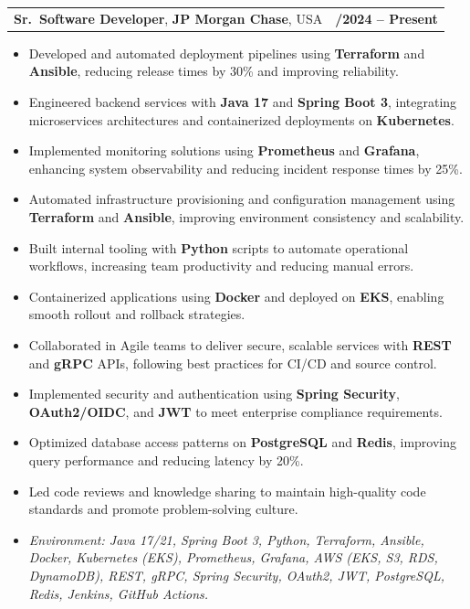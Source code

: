 \documentclass[letterpaper,11pt]{article}
\makeatletter
\newcommand{\resumeItem}[1]{
  \item\footnotesize{
    {#1 \vspace{-2pt}}
  }
}
\newcommand{\resumeSubheading}[4]{
  \vspace{-2pt}\item
    \begin{tabular*}{1.0\textwidth}[t]{l@{\extracolsep{\fill}}r}
      \textbf{\fontsize{10pt}{14pt}\selectfont #3}, \textbf{\fontsize{10pt}{14pt}\selectfont #1}, \fontsize{10pt}{14pt}\selectfont #4 & \textbf{\fontsize{10pt}{14pt}\selectfont #2} \\
    \end{tabular*}\vspace{-7pt}
}
\newcommand{\resumeItemListStart}{\begin{itemize}[leftmargin=*]}
\newcommand{\resumeItemListEnd}{\end{itemize}\vspace{-5pt}}
\makeatother
\begin{document}
\resumeSubheading
{JP Morgan Chase}{09/2024 -- Present}
{Sr.\ Software Developer}{USA}
\resumeItemListStart
  \resumeItem{Developed and automated deployment pipelines using \textbf{Terraform} and \textbf{Ansible}, reducing release times by 30\% and improving reliability.}
  \resumeItem{Engineered backend services with \textbf{Java 17} and \textbf{Spring Boot 3}, integrating microservices architectures and containerized deployments on \textbf{Kubernetes}.}
  \resumeItem{Implemented monitoring solutions using \textbf{Prometheus} and \textbf{Grafana}, enhancing system observability and reducing incident response times by 25\%.}
  \resumeItem{Automated infrastructure provisioning and configuration management using \textbf{Terraform} and \textbf{Ansible}, improving environment consistency and scalability.}
  \resumeItem{Built internal tooling with \textbf{Python} scripts to automate operational workflows, increasing team productivity and reducing manual errors.}
  \resumeItem{Containerized applications using \textbf{Docker} and deployed on \textbf{EKS}, enabling smooth rollout and rollback strategies.}
  \resumeItem{Collaborated in Agile teams to deliver secure, scalable services with \textbf{REST} and \textbf{gRPC} APIs, following best practices for CI/CD and source control.}
  \resumeItem{Implemented security and authentication using \textbf{Spring Security}, \textbf{OAuth2/OIDC}, and \textbf{JWT} to meet enterprise compliance requirements.}
  \resumeItem{Optimized database access patterns on \textbf{PostgreSQL} and \textbf{Redis}, improving query performance and reducing latency by 20\%.}
  \resumeItem{Led code reviews and knowledge sharing to maintain high-quality code standards and promote problem-solving culture.}
  \resumeItem{\textit{Environment: Java 17/21, Spring Boot 3, Python, Terraform, Ansible, Docker, Kubernetes (EKS), Prometheus, Grafana, AWS (EKS, S3, RDS, DynamoDB), REST, gRPC, Spring Security, OAuth2, JWT, PostgreSQL, Redis, Jenkins, GitHub Actions.}}
\resumeItemListEnd
\end{document}
